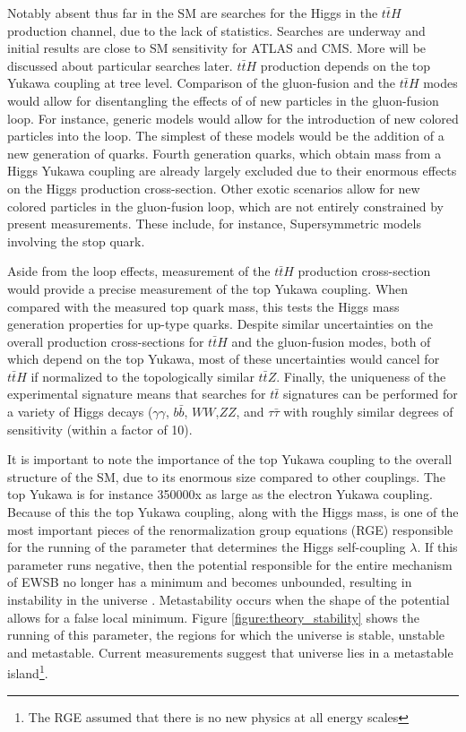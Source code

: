 Notably absent thus far in the SM are searches for the Higgs in the $t\bar{t}H$
production channel, due to the lack of statistics. Searches are underway and
initial results are close to SM sensitivity for ATLAS and CMS. More will be
discussed about particular searches later. $t\bar{t}H$ production depends on the
top Yukawa coupling at tree level. Comparison of the gluon-fusion and the $t\bar{t}H$
modes would allow for disentangling the effects of of new particles in the
gluon-fusion loop\cite{Dawson:2013bba}. For instance, generic models would allow for the
introduction of new colored particles into the loop. The simplest of these
models would be the addition of a new generation of quarks. Fourth
generation quarks, which obtain mass from a Higgs Yukawa coupling are already
largely excluded due to their enormous effects on the Higgs production
cross-section\cite{Eberhardt:2012gv}. Other exotic scenarios allow for new colored particles in the
gluon-fusion loop, which are not entirely constrained by present measurements\cite{Carena:2013iba,ArkaniHamed:2012kq,Carmi:2012yp}.
These include, for instance, Supersymmetric models involving the stop quark.  


Aside from the loop effects, measurement of the $t\bar{t}H$ production
cross-section would provide a precise measurement of the top Yukawa coupling.
When compared with the measured top quark mass, this tests the Higgs mass
generation properties for up-type quarks. Despite similar uncertainties on
the overall production cross-sections for $t\bar{t}H$ and the gluon-fusion modes, both
of which depend on the top Yukawa, most of these uncertainties would cancel for
$t\bar{t}H$ if normalized to the topologically similar $t\bar{t}Z$. Finally, the uniqueness
of the experimental signature means that
searches for $t\bar{t}$ signatures can be performed for a variety of Higgs decays ($\gamma\gamma$, $b\bar{b}$,
$WW$,$ZZ$, and $\tau\bar{\tau}$ with roughly similar degrees of sensitivity (within a factor of 10)\cite{Dawson:2013bba}. 



It is important to note the importance of the top Yukawa coupling
to the overall structure of the SM, due to its enormous size compared
to other couplings. The top Yukawa is for instance 350000x as large as the electron
Yukawa coupling. Because of this the top Yukawa coupling,
along with the Higgs mass, is one of the most important pieces of the renormalization group equations (RGE)
responsible for the running of the parameter that determines the Higgs self-coupling $\lambda$. 
If this parameter runs negative, then the potential responsible for the entire mechanism 
of EWSB no longer has a minimum and becomes unbounded, resulting in instability in the universe \cite{Degrassi:2012ry}.
Metastability occurs when the shape of the potential allows for a false local minimum.
Figure \ref{figure:theory_stability} shows the running of this parameter, the regions
for which the universe is stable, unstable and metastable. Current
measurements suggest that universe lies in a metastable island\footnote{The
RGE assumed that there is no new physics at all energy scales}.


